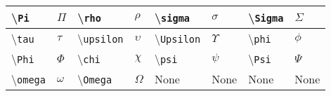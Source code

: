 \documentclass[a4paper, 12pt]{report}
\def\tabsize{1.9cm}
\def\ltabsize{1.4cm}
\begin{document}
\begin{center}
\begin{tabular}{|m{\tabsize}|m{\ltabsize}|m{\tabsize}|m{\ltabsize}|m{\tabsize}|m{\ltabsize}|m{\tabsize}|m{\ltabsize}|}
\textbackslash \texttt{Pi} & $\Pi$ & \textbackslash \texttt{rho} & $\rho$ & \textbackslash \texttt{sigma} & $\sigma$ & \textbackslash \texttt{Sigma} & $\Sigma$ \\ \hline
\textbackslash \texttt{tau}  & $\tau$ & \textbackslash \texttt{upsilon} & $\upsilon$ & \textbackslash \texttt{Upsilon} & $\Upsilon$ & \textbackslash \texttt{phi} & $\phi$ \\ \hline
\textbackslash \texttt{Phi} & $\Phi$ & \textbackslash \texttt{chi} & $\chi$ & \textbackslash \texttt{psi} & $\psi$ & \textbackslash \texttt{Psi} & $\Psi$ \\ \hline
\textbackslash \texttt{omega} & $\omega$ & \textbackslash \texttt{Omega} & $\Omega$ & None & None & None & None \\ \hline
\end{tabular}


\end{center}
\end{document}
